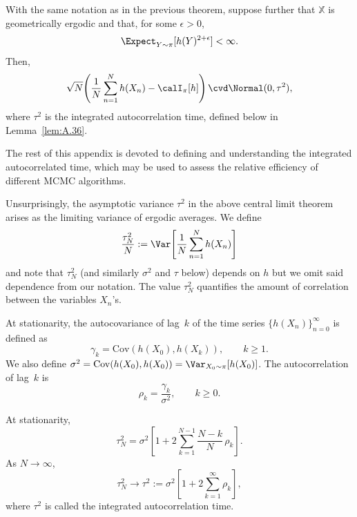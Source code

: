 \begin{theorem}
\label{thm:A.34}
With the same notation as in the previous theorem, suppose further that $\mathbb{X}$ is
geometrically ergodic and that, for some $\epsilon > 0$,
\[
  \Expect_{Y \sim \pi}[h(Y)^{2+\epsilon}] < \infty.
\]
Then,
\[
  \sqrt{N}\!\left(\frac{1}{N} \sum_{n=1}^{N} h(X_n) - \calI_\pi[h]\right)
  \cvd \Normal(0, \tau^2),
\]
where $\tau^2$ is the integrated autocorrelation time, defined below in Lemma~\ref{lem:A.36}.
\end{theorem}

The rest of this appendix is devoted to defining and understanding the integrated autocorrelated
time, which may be used to assess the relative efficiency of different MCMC algorithms.

Unsurprisingly, the asymptotic variance $\tau^2$ in the above central limit theorem arises as the
limiting variance of ergodic averages.  We define
\[
  \frac{\tau_N^2}{N} := \Var\!\left[\frac{1}{N} \sum_{n=1}^{N} h(X_n)\right]
\]
and note that $\tau_N^2$ (and similarly $\sigma^2$ and $\tau$ below) depends on $h$ but we omit
said dependence from our notation.  The value $\tau_N^2$ quantifies the amount of correlation
between the variables $X_n$'s.

\begin{definition}
\label{def:A.35}
At stationarity, the autocovariance of lag~$k$ of the time series $\{h(X_n)\}_{n=0}^\infty$ is
defined as
\[
  \gamma_k = \mathrm{Cov}(h(X_0), h(X_k)), \qquad k \geq 1.
\]
We also define $\sigma^2 = \mathrm{Cov}(h(X_0), h(X_0)) = \Var_{X_0 \sim \pi}[h(X_0)]$.  The
autocorrelation of lag~$k$ is
\[
  \rho_k = \frac{\gamma_k}{\sigma^2}, \qquad k \geq 0.
\]
\end{definition}

\begin{lemma}
\label{lem:A.36}
At stationarity,
\[
  \tau_N^2 = \sigma^2 \left[1 + 2\sum_{k=1}^{N-1} \frac{N-k}{N}\,\rho_k\right].
\]
As $N \to \infty$,
\[
  \tau_N^2 \to \tau^2 := \sigma^2 \left[1 + 2\sum_{k=1}^{\infty} \rho_k\right],
\]
where $\tau^2$ is called the integrated autocorrelation time.
\end{lemma}

